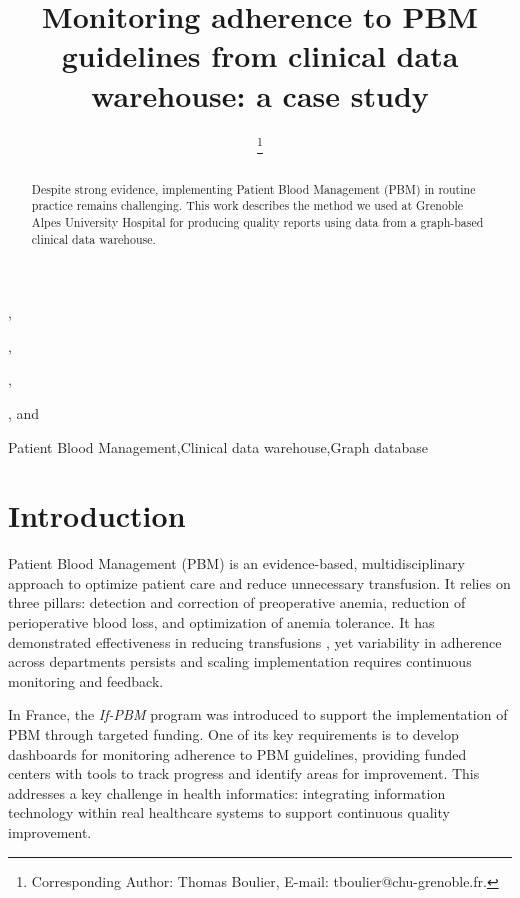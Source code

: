 \documentclass{IOS-Book-Article}
\begin{document}
\pagestyle{headings}
\def\thepage{}
\begin{frontmatter}

\title{Monitoring adherence to PBM guidelines from clinical data warehouse: a case study}

\author[A]{ },
\author[A]{ },
\author[A]{ },
\author[A]{ %
\thanks{Corresponding Author: Thomas Boulier, E-mail: tboulier@chu-grenoble.fr.}}, 
and
\author[A]{ }

\address[A]{Univ. Grenoble Alpes, CNRS, UMR 5525, VetAgro Sup, Grenoble INP, CHU Grenoble Alpes, TIMC, 38000 Grenoble, France}

\begin{abstract}
Despite strong evidence, implementing Patient Blood Management (PBM) in routine practice remains 
challenging. This work describes the method we used at Grenoble Alpes University Hospital for 
producing quality reports using data from a graph-based clinical data warehouse.
\end{abstract}

\begin{keyword}
Patient Blood Management\sep Clinical data warehouse\sep Graph database
\end{keyword}
\end{frontmatter}

\section{Introduction}

Patient Blood Management (PBM) is an evidence-based, multidisciplinary approach to
optimize patient care and reduce unnecessary transfusion. 
It relies on three pillars: detection and correction of preoperative anemia, reduction 
of perioperative blood loss, and optimization of anemia tolerance. 
It has demonstrated effectiveness in reducing 
transfusions \cite{godonReductionRedBlood2024}, yet variability in adherence across 
departments persists and scaling implementation requires continuous monitoring and feedback.

In France, the \textit{If-PBM} program was introduced to support the implementation of PBM 
through targeted funding.  One of its key requirements is to develop dashboards for monitoring 
adherence to PBM guidelines, providing funded centers with tools to track progress and identify areas
for improvement. This addresses a key challenge in health informatics: integrating information 
technology within real healthcare systems to support continuous quality improvement.
\end{document}
